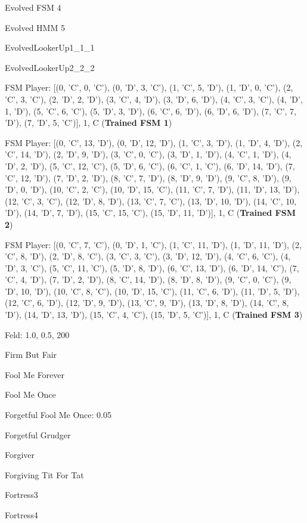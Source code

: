 \item Evolved FSM 4
\item Evolved HMM 5
\item EvolvedLookerUp1\_1\_1
\item EvolvedLookerUp2\_2\_2
\item FSM Player: [(0, 'C', 0, 'C'), (0, 'D', 3, 'C'), (1, 'C', 5, 'D'), (1, 'D', 0, 'C'), (2, 'C', 3, 'C'), (2, 'D', 2, 'D'), (3, 'C', 4, 'D'), (3, 'D', 6, 'D'), (4, 'C', 3, 'C'), (4, 'D', 1, 'D'), (5, 'C', 6, 'C'), (5, 'D', 3, 'D'), (6, 'C', 6, 'D'), (6, 'D', 6, 'D'), (7, 'C', 7, 'D'), (7, 'D', 5, 'C')], 1, C
(\textbf{Trained FSM 1})\item FSM Player: [(0, 'C', 13, 'D'), (0, 'D', 12, 'D'), (1, 'C', 3, 'D'), (1, 'D', 4, 'D'), (2, 'C', 14, 'D'), (2, 'D', 9, 'D'), (3, 'C', 0, 'C'), (3, 'D', 1, 'D'), (4, 'C', 1, 'D'), (4, 'D', 2, 'D'), (5, 'C', 12, 'C'), (5, 'D', 6, 'C'), (6, 'C', 1, 'C'), (6, 'D', 14, 'D'), (7, 'C', 12, 'D'), (7, 'D', 2, 'D'), (8, 'C', 7, 'D'), (8, 'D', 9, 'D'), (9, 'C', 8, 'D'), (9, 'D', 0, 'D'), (10, 'C', 2, 'C'), (10, 'D', 15, 'C'), (11, 'C', 7, 'D'), (11, 'D', 13, 'D'), (12, 'C', 3, 'C'), (12, 'D', 8, 'D'), (13, 'C', 7, 'C'), (13, 'D', 10, 'D'), (14, 'C', 10, 'D'), (14, 'D', 7, 'D'), (15, 'C', 15, 'C'), (15, 'D', 11, 'D')], 1, C
(\textbf{Trained FSM 2})\item FSM Player: [(0, 'C', 7, 'C'), (0, 'D', 1, 'C'), (1, 'C', 11, 'D'), (1, 'D', 11, 'D'), (2, 'C', 8, 'D'), (2, 'D', 8, 'C'), (3, 'C', 3, 'C'), (3, 'D', 12, 'D'), (4, 'C', 6, 'C'), (4, 'D', 3, 'C'), (5, 'C', 11, 'C'), (5, 'D', 8, 'D'), (6, 'C', 13, 'D'), (6, 'D', 14, 'C'), (7, 'C', 4, 'D'), (7, 'D', 2, 'D'), (8, 'C', 14, 'D'), (8, 'D', 8, 'D'), (9, 'C', 0, 'C'), (9, 'D', 10, 'D'), (10, 'C', 8, 'C'), (10, 'D', 15, 'C'), (11, 'C', 6, 'D'), (11, 'D', 5, 'D'), (12, 'C', 6, 'D'), (12, 'D', 9, 'D'), (13, 'C', 9, 'D'), (13, 'D', 8, 'D'), (14, 'C', 8, 'D'), (14, 'D', 13, 'D'), (15, 'C', 4, 'C'), (15, 'D', 5, 'C')], 1, C
(\textbf{Trained FSM 3})\item Feld: 1.0, 0.5, 200
\item Firm But Fair
\item Fool Me Forever
\item Fool Me Once
\item Forgetful Fool Me Once: 0.05
\item Forgetful Grudger
\item Forgiver
\item Forgiving Tit For Tat
\item Fortress3
\item Fortress4
